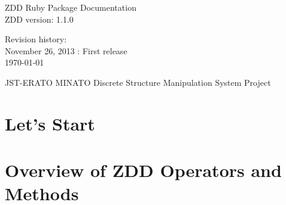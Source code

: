 \documentclass[a4paper]{book}
\begin{document}
\begin{titlepage}
\begin{center}
{\huge ZDD Ruby Package Documentation}\\
\vspace{10truept}
{\normalsize ZDD version: 1.1.0}\\
\vspace{1cm}

Revision history:\\
November 26, 2013 : First release\\
\vspace{18cm}
{\small \today}

{\small JST-ERATO MINATO Discrete Structure Manipulation System Project}
\end{center}
\end{titlepage}

\setcounter{tocdepth}{1}
\tableofcontents

\chapter{Let's Start}








\chapter{Overview of ZDD Operators and Methods}




























































\fi
\end{document}
